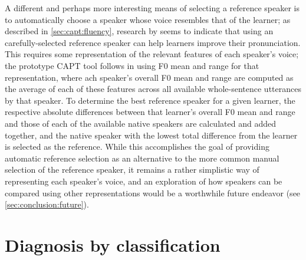 		A different and perhaps more interesting means of selecting a reference speaker is to automatically choose a speaker whose voice resembles
that of the learner; as described in \cref{sec:capt:fluency}, research by \textcite{Probst2002} seems to indicate that using an carefully-selected reference speaker can help learners improve their pronunciation. 
	This requires some representation of the relevant features of each speaker's voice; the prototype CAPT tool follows \textcite{Probst2002} in using F0 mean and range for that representation, where ach speaker's overall F0 mean and range are computed as the average of each of these features across all available whole-sentence utterances by that speaker. To determine the best reference speaker for a given learner, the respective absolute differences between that learner's overall F0 mean and range and those of each of the available native speakers are calculated and added together, and the native speaker with the lowest total difference from the learner is selected as the reference. While this accomplishes the goal of providing automatic reference selection as an alternative to the more common manual selection of the reference speaker, it remains a rather simplistic way of representing each speaker's voice, and an exploration of how speakers can be compared using other representations would be a worthwhile future endeavor (see \cref{sec:conclusion:future}).


	
	

	\section{Diagnosis by classification}
	\label{sec:diag:classification}
	
		
	
